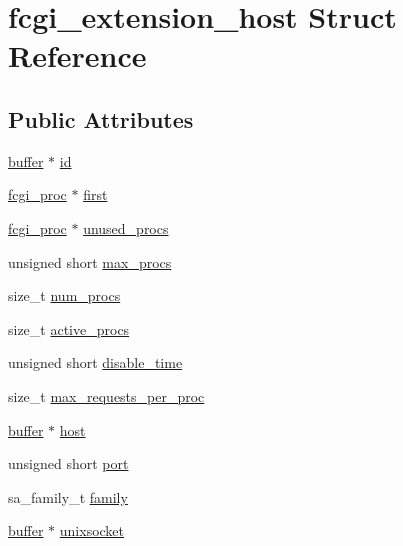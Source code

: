 \hypertarget{structfcgi__extension__host}{\section{fcgi\-\_\-extension\-\_\-host Struct Reference}
\label{structfcgi__extension__host}
}
\subsection*{Public Attributes}
\begin{DoxyCompactItemize}
\item 
\hyperlink{structbuffer}{buffer} $\ast$ \hyperlink{structfcgi__extension__host_a0b39658d0376f369c480f2cce166467e}{id}
\item 
\hyperlink{structfcgi__proc}{fcgi\-\_\-proc} $\ast$ \hyperlink{structfcgi__extension__host_abb8dfa6d141106454e5f09ae9abc9a84}{first}
\item 
\hyperlink{structfcgi__proc}{fcgi\-\_\-proc} $\ast$ \hyperlink{structfcgi__extension__host_abc9cc43adc180cf06b771c8a5cff0f61}{unused\-\_\-procs}
\item 
unsigned short \hyperlink{structfcgi__extension__host_a223dbc6acf4f59361be6c6c644af12c0}{max\-\_\-procs}
\item 
size\-\_\-t \hyperlink{structfcgi__extension__host_aadeb7bc043c469f865c565ba35e2ca3c}{num\-\_\-procs}
\item 
size\-\_\-t \hyperlink{structfcgi__extension__host_af3fda20375871a51758c52b477b0153b}{active\-\_\-procs}
\item 
unsigned short \hyperlink{structfcgi__extension__host_ac85fe367fe7eeb221092647c6e7cec7e}{disable\-\_\-time}
\item 
size\-\_\-t \hyperlink{structfcgi__extension__host_af07d55d403b8d4b2f4cbab23ad5367c2}{max\-\_\-requests\-\_\-per\-\_\-proc}
\item 
\hyperlink{structbuffer}{buffer} $\ast$ \hyperlink{structfcgi__extension__host_a48f3e193249fa8a3bd6492ebc965c393}{host}
\item 
unsigned short \hyperlink{structfcgi__extension__host_ad41957f0ebf10f9066e84a02ecd269f8}{port}
\item 
sa\-\_\-family\-\_\-t \hyperlink{structfcgi__extension__host_a51b5a972ef027777775dd0cc7ec24e42}{family}
\item 
\hyperlink{structbuffer}{buffer} $\ast$ \hyperlink{structfcgi__extension__host_a3a3daea2e667a74a3d8eca2216603c47}{unixsocket}
\item 

\end{DoxyCompactItemize}
